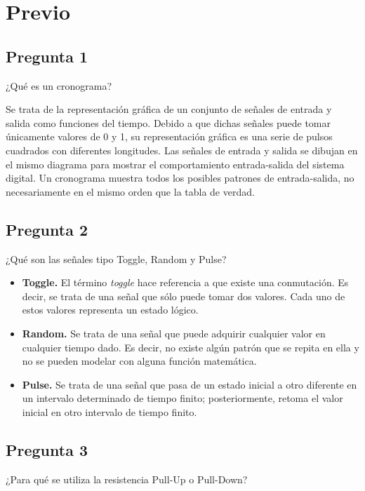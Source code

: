 \documentclass[../main.tex]{subfiles}
\begin{document}
\section*{Previo}
\subsection*{Pregunta 1}
\begin{em}
  ¿Qué es un cronograma?
\end{em}

Se trata de la representación gráfica de un conjunto de señales de entrada y 
salida como funciones del tiempo. Debido a que dichas señales puede tomar 
únicamente valores de 0 y 1, su representación gráfica es una serie de pulsos 
cuadrados con diferentes longitudes. Las señales de entrada y salida se 
dibujan en el mismo diagrama para mostrar el comportamiento entrada-salida del 
sistema digital. Un cronograma muestra todos los posibles patrones de 
entrada-salida, no necesariamente en el mismo orden que la tabla de verdad.


\subsection*{Pregunta 2}
\begin{em}
  ¿Qué son las señales tipo Toggle, Random y Pulse?
\end{em}
\begin{itemize}
  \item \textbf{Toggle.} El término \textit{toggle} hace referencia a que 
    existe una conmutación. Es decir, se trata de una señal que sólo puede 
    tomar dos valores. Cada uno de estos valores representa un estado lógico.
  \item \textbf{Random.} Se trata de una señal que puede adquirir cualquier 
    valor en cualquier tiempo dado. Es decir, no existe algún patrón que se 
    repita en ella y no se pueden modelar con alguna función matemática.
  \item \textbf{Pulse.} Se trata de una señal que pasa de un estado inicial a 
    otro diferente en un intervalo determinado de tiempo finito; 
    posteriormente, retoma el valor inicial en otro intervalo de tiempo 
    finito.
\end{itemize}


\subsection*{Pregunta 3}
\begin{em}
  ¿Para qué se utiliza la resistencia Pull-Up o Pull-Down?
\end{em}
\end{document}
